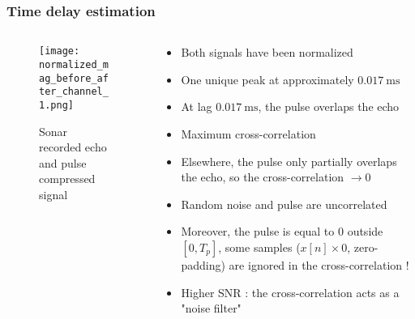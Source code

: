 \documentclass[UKenglish,8pt,aspectratio=1610]{beamer}
\begin{document}
\begin{frame}
	\frametitle{Time delay estimation}
		\begin{columns}
		\begin{column}{0.5\textwidth}
			\vspace{-25pt}
			\begin{figure}[h!]
				\texttt{[image: normalized\_mag\_before\_after\_channel\_1.png]}
				\centering
				\caption{Sonar recorded echo and pulse compressed signal}
			\end{figure}
		\end{column}
		\begin{column}{0.5\textwidth}
		\begin{itemize}
			\item Both signals have been normalized
			\item One unique peak at approximately $0.017~\si{\milli\second}$
			\item At lag $0.017~\si{\milli\second}$, the pulse overlaps the echo
			\item Maximum cross-correlation
			\item Elsewhere, the pulse only partially overlaps the echo, so the cross-correlation $\rightarrow 0$
			\item Random noise and pulse are uncorrelated
			\item Moreover, the pulse is equal to 0 outside $[0,T_p]$, some samples ($x[n]\times 0$, zero-padding) are ignored in the cross-correlation !
			\item Higher SNR : the cross-correlation acts as a "noise filter"
		\end{itemize}
		\end{column}
	\end{columns} 
	
\end{frame}
\end{document}
